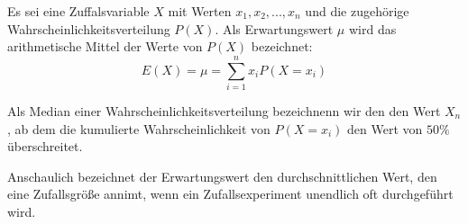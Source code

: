 \documentclass[main.tex]{subfiles}
\begin{document}
\begin{Definition}[Erwartungswert]
  Es sei eine Zuffalsvariable $X$ mit Werten $x_1,x_2,...,x_n$ und die zugehörige Wahrscheinlichkeitsverteilung $P(X)$. Als Erwartungswert $\mu$ wird das arithmetische Mittel der Werte von $P(X)$ bezeichnet:
  $$E(X)=\mu=\sum_{i=1}^{n}x_i P(X=x_i)$$
\end{Definition}
\begin{Definition}
  Als Median einer Wahrscheinlichkeitsverteilung bezeichnenn wir den den Wert $X_n$, ab dem die kumulierte Wahrscheinlichkeit von $P(X=x_i)$ den Wert von $50\%$ überschreitet.
\end{Definition}
\begin{Bemerkung}
  Anschaulich bezeichnet der Erwartungswert den durchschnittlichen Wert, den eine Zufallsgröße annimt, wenn ein Zufallsexperiment unendlich oft durchgeführt wird.
\end{Bemerkung}
\end{document}
